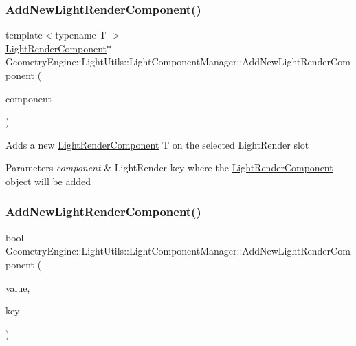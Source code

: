 \subsubsection{\texorpdfstring{AddNewLightRenderComponent()}{AddNewLightRenderComponent()}\hspace{0.1cm}{\footnotesize\ttfamily [1/2]}}
{\footnotesize\ttfamily template$<$typename T $>$ \\
\mbox{\hyperlink{class_geometry_engine_1_1_light_utils_1_1_light_render_component}{Light\+Render\+Component}}$\ast$ Geometry\+Engine\+::\+Light\+Utils\+::\+Light\+Component\+Manager\+::\+Add\+New\+Light\+Render\+Component (\begin{DoxyParamCaption}\item[{\mbox{\hyperlink{namespace_geometry_engine_1_1_light_utils_ac3078de660742daceaa06bd9bc61d24a}{Light\+Render}}}]{component }\end{DoxyParamCaption})\hspace{0.3cm}{\ttfamily [inline]}}

Adds a new \mbox{\hyperlink{class_geometry_engine_1_1_light_utils_1_1_light_render_component}{Light\+Render\+Component}} T on the selected Light\+Render slot 
\begin{DoxyParams}{Parameters}
{\em component} & Light\+Render key where the \mbox{\hyperlink{class_geometry_engine_1_1_light_utils_1_1_light_render_component}{Light\+Render\+Component}} object will be added \\
\hline
\end{DoxyParams}
\mbox{\label{class_geometry_engine_1_1_light_utils_1_1_light_component_manager_a94a6f31346ad67f67b8dcd8988a35fa6}} 
\subsubsection{\texorpdfstring{AddNewLightRenderComponent()}{AddNewLightRenderComponent()}\hspace{0.1cm}{\footnotesize\ttfamily [2/2]}}
{\footnotesize\ttfamily bool Geometry\+Engine\+::\+Light\+Utils\+::\+Light\+Component\+Manager\+::\+Add\+New\+Light\+Render\+Component (\begin{DoxyParamCaption}\item[{\mbox{\hyperlink{class_geometry_engine_1_1_light_utils_1_1_light_render_component}{Light\+Render\+Component}} $\ast$}]{value,  }\item[{\mbox{\hyperlink{namespace_geometry_engine_1_1_light_utils_ac3078de660742daceaa06bd9bc61d24a}{Light\+Render}}}]{key }\end{DoxyParamCaption})}


